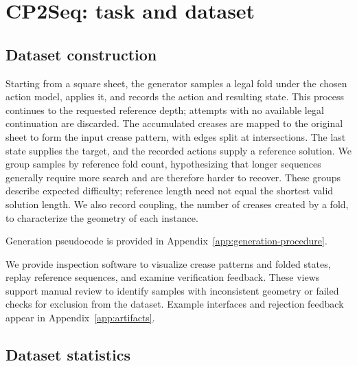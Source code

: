 \section{CP2Seq: task and dataset}
\label{sec:cp2seq}



\subsection{Dataset construction}
\label{sec:cp2seq-generation}
\label{sec:cp2seq-why}
\label{sec:cp2seq-difficulty}

Starting from a square sheet, the generator samples a legal fold under the chosen action model,
applies it, and records the action and resulting state. This process continues to the requested
reference depth; attempts with no available legal continuation are discarded. The accumulated
creases are mapped to the original sheet to form the input crease pattern, with edges split at
intersections. The last state supplies the target, and the recorded actions supply a reference
solution.
We group samples by reference fold count, hypothesizing that longer sequences generally require
more search and are therefore harder to recover. These groups describe expected difficulty;
reference length need not equal the shortest valid solution length. We also record coupling,
the number of creases created by a fold, to characterize the geometry of each instance.

Generation pseudocode is provided in Appendix~\ref{app:generation-procedure}.

We provide inspection software to visualize crease patterns and folded states, replay
reference sequences, and examine verification feedback. These views support manual
review to identify samples with inconsistent geometry or failed checks for exclusion
from the dataset. Example interfaces and rejection feedback appear in
Appendix~\ref{app:artifacts}.



\subsection{Dataset statistics}
\label{sec:dataset-statistics}
\label{sec:cp2seq-contents}


